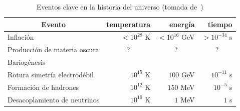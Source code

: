     {\renewcommand{\arraystretch}{1.1}\hypersetup{citecolor=webgreentint}
        \begin{table}[t]
            \centering
            \caption[Eventos clave en la historia del universo]{Eventos clave en la historia del universo (tomada de~\cite{baumann2022cosmology})}
            \label{tab::eventos}
            \begin{tabular}{lrrr}
                \toprule
                \multicolumn{1}{c}{\textbf{Evento}}               & \textbf{temperatura}                                              & \textbf{energía}                                                  & \textbf{tiempo}                                                   \\ \midrule
                \rowcolor{migris!50}
                {\color[HTML]{FFFFFF} Inflación}                  & {\color[HTML]{FFFFFF} \(<10^{28}\) K}                             & {\color[HTML]{FFFFFF} \(<10^{16}\) GeV}                           & {\color[HTML]{FFFFFF} \(>10^{-34}\) s}                            \\
                Producción de materia oscura                    & \multicolumn{1}{c}{?}                                             & \multicolumn{1}{c}{?}                                             & \multicolumn{1}{c}{?}                                             \\
                \rowcolor{migris!50}
                {\color[HTML]{FFFFFF} Bariogénesis}      & \multicolumn{1}{c}{\cellcolor{migris!50}{\color[HTML]{FFFFFF} ?}} & \multicolumn{1}{c}{\cellcolor{migris!50}{\color[HTML]{FFFFFF} ?}} & \multicolumn{1}{c}{\cellcolor{migris!50}{\color[HTML]{FFFFFF} ?}} \\
                Rotura simetría electrodébil                   & \(10^{15}\) K                                                     & \(100\) GeV                                                       & \(10^{-11}\) s                                                    \\
                \rowcolor{migris!50}
                {\color[HTML]{FFFFFF} Formación de hadrones}      & {\color[HTML]{FFFFFF} \(10^{12}\) K}                              & {\color[HTML]{FFFFFF} \(150\) MeV}                                & {\color[HTML]{FFFFFF} \(10^{-5}\) s}                              \\
                Desacoplamiento de neutrinos                      & \(10^{10}\) K                                                     & \(1\) MeV                                                         & \(1\) s                                                           \\

\end{tabular}
\end{table}}
